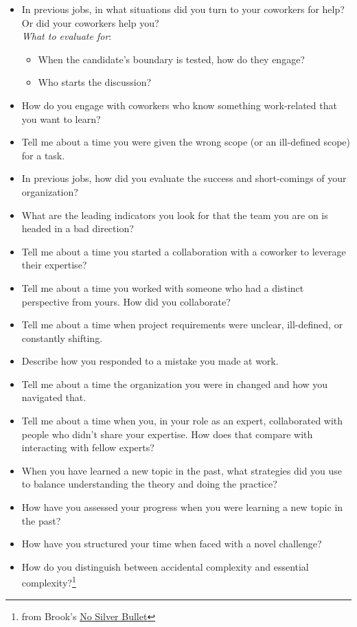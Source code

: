 \begin{itemize}
    \item In previous jobs, in what situations did you turn to your coworkers for help? Or did your coworkers help you?\\
    \textit{What to evaluate for}:
    \begin{itemize}
        \item When the candidate's boundary is tested, how do they engage?
        \item Who starts the discussion?
    \end{itemize}
    \item How do you engage with coworkers who know something work-related that you want to learn?
    \item Tell me about a time you were given the wrong scope (or an ill-defined scope) for a task. 
    \item In previous jobs, how did you evaluate the success and short-comings of your organization?
    \item What are the leading indicators you look for that the team you are on is headed in a bad direction?
    \item Tell me about a time you started a collaboration with a coworker to leverage their expertise?
    \item Tell me about a time you worked with someone who had a distinct perspective from yours. How did you collaborate?
    \item Tell me about a time when project requirements were unclear, ill-defined, or constantly shifting.
    \item Describe how you responded to a mistake you made at work.
    \item Tell me about a time the organization you were in changed and how you navigated that. 
    \item Tell me about a time when you, in your role as an expert, collaborated with people who didn't share your expertise. How does that compare with interacting with fellow experts?
    \item When you have learned a new topic in the past, what strategies did you use to balance understanding the theory and doing the practice?
    \item How have you assessed your progress when you were learning a new topic in the past?
    \item How have you structured your time when faced with a novel challenge?
    \item How do you distinguish between accidental complexity and essential complexity?\footnote{from Brook's \href{https://en.wikipedia.org/wiki/No_Silver_Bullet}{No Silver Bullet}
    }
\end{itemize}

